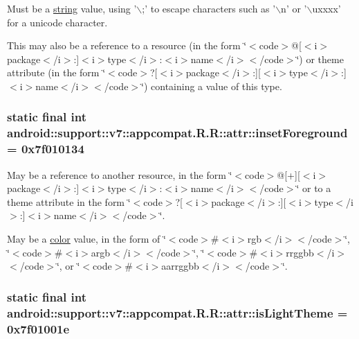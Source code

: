Must be a \hyperlink{classandroid_1_1support_1_1v7_1_1appcompat_1_1_r_1_1string}{string} value, using '$\backslash$;' to escape characters such as '$\backslash$n' or '$\backslash$uxxxx' for a unicode character. 

This may also be a reference to a resource (in the form \char`\"{}$<$code$>$@\mbox{[}$<$i$>$package$<$/i$>$:\mbox{]}$<$i$>$type$<$/i$>$:$<$i$>$name$<$/i$>$$<$/code$>$\char`\"{}) or theme attribute (in the form \char`\"{}$<$code$>$?\mbox{[}$<$i$>$package$<$/i$>$:\mbox{]}\mbox{[}$<$i$>$type$<$/i$>$:\mbox{]}$<$i$>$name$<$/i$>$$<$/code$>$\char`\"{}) containing a value of this type. \hypertarget{classandroid_1_1support_1_1v7_1_1appcompat_1_1_r_1_1attr_507dc3a5a042cd883cf35f116ed1677a}{
\subsubsection[{insetForeground}]{\setlength{\rightskip}{0pt plus 5cm}static final int android::support::v7::appcompat.R.R::attr::insetForeground = 0x7f010134}}
\label{classandroid_1_1support_1_1v7_1_1appcompat_1_1_r_1_1attr_507dc3a5a042cd883cf35f116ed1677a}


May be a reference to another resource, in the form \char`\"{}$<$code$>$@\mbox{[}+\mbox{]}\mbox{[}$<$i$>$package$<$/i$>$:\mbox{]}$<$i$>$type$<$/i$>$:$<$i$>$name$<$/i$>$$<$/code$>$\char`\"{} or to a theme attribute in the form \char`\"{}$<$code$>$?\mbox{[}$<$i$>$package$<$/i$>$:\mbox{]}\mbox{[}$<$i$>$type$<$/i$>$:\mbox{]}$<$i$>$name$<$/i$>$$<$/code$>$\char`\"{}. 

May be a \hyperlink{classandroid_1_1support_1_1v7_1_1appcompat_1_1_r_1_1color}{color} value, in the form of \char`\"{}$<$code$>$\#$<$i$>$rgb$<$/i$>$$<$/code$>$\char`\"{}, \char`\"{}$<$code$>$\#$<$i$>$argb$<$/i$>$$<$/code$>$\char`\"{}, \char`\"{}$<$code$>$\#$<$i$>$rrggbb$<$/i$>$$<$/code$>$\char`\"{}, or \char`\"{}$<$code$>$\#$<$i$>$aarrggbb$<$/i$>$$<$/code$>$\char`\"{}. \hypertarget{classandroid_1_1support_1_1v7_1_1appcompat_1_1_r_1_1attr_bc852b34691fe03b4e44887e8134abff}{
\subsubsection[{isLightTheme}]{\setlength{\rightskip}{0pt plus 5cm}static final int android::support::v7::appcompat.R.R::attr::isLightTheme = 0x7f01001e}}
\label{classandroid_1_1support_1_1v7_1_1appcompat_1_1_r_1_1attr_bc852b34691fe03b4e44887e8134abff}


